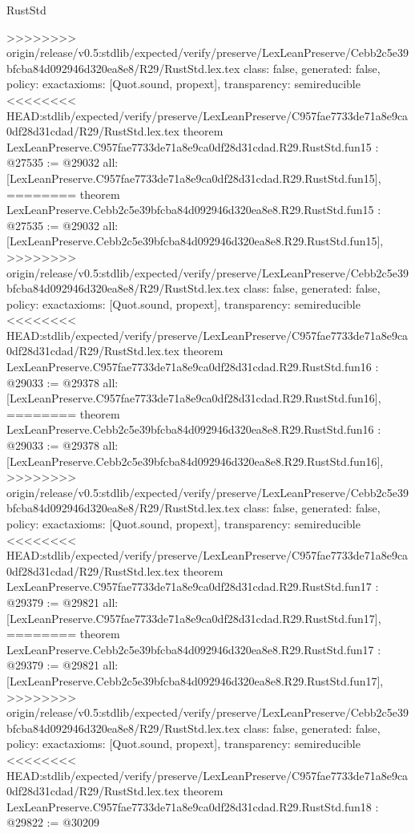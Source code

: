 \begin{lexlean}{RustStd}
\begin{coremodule}
{\begin{coremodule}
{{{{{{{{{{{{{{{{{{>>>>>>>> origin/release/v0.5:stdlib/expected/verify/preserve/LexLeanPreserve/Cebb2c5e39bfcba84d092946d320ea8e8/R29/RustStd.lex.tex
  class: false,
  generated: false,
  policy: exact{axioms: [Quot.sound, propext]},
  transparency: semireducible
}
<<<<<<<< HEAD:stdlib/expected/verify/preserve/LexLeanPreserve/C957fae7733de71a8e9ca0df28d31cdad/R29/RustStd.lex.tex
theorem LexLeanPreserve.C957fae7733de71a8e9ca0df28d31cdad.R29.RustStd.fun15 : @27535 := @29032 {
  all: [LexLeanPreserve.C957fae7733de71a8e9ca0df28d31cdad.R29.RustStd.fun15],
========
theorem LexLeanPreserve.Cebb2c5e39bfcba84d092946d320ea8e8.R29.RustStd.fun15 : @27535 := @29032 {
  all: [LexLeanPreserve.Cebb2c5e39bfcba84d092946d320ea8e8.R29.RustStd.fun15],
>>>>>>>> origin/release/v0.5:stdlib/expected/verify/preserve/LexLeanPreserve/Cebb2c5e39bfcba84d092946d320ea8e8/R29/RustStd.lex.tex
  class: false,
  generated: false,
  policy: exact{axioms: [Quot.sound, propext]},
  transparency: semireducible
}
<<<<<<<< HEAD:stdlib/expected/verify/preserve/LexLeanPreserve/C957fae7733de71a8e9ca0df28d31cdad/R29/RustStd.lex.tex
theorem LexLeanPreserve.C957fae7733de71a8e9ca0df28d31cdad.R29.RustStd.fun16 : @29033 := @29378 {
  all: [LexLeanPreserve.C957fae7733de71a8e9ca0df28d31cdad.R29.RustStd.fun16],
========
theorem LexLeanPreserve.Cebb2c5e39bfcba84d092946d320ea8e8.R29.RustStd.fun16 : @29033 := @29378 {
  all: [LexLeanPreserve.Cebb2c5e39bfcba84d092946d320ea8e8.R29.RustStd.fun16],
>>>>>>>> origin/release/v0.5:stdlib/expected/verify/preserve/LexLeanPreserve/Cebb2c5e39bfcba84d092946d320ea8e8/R29/RustStd.lex.tex
  class: false,
  generated: false,
  policy: exact{axioms: [Quot.sound, propext]},
  transparency: semireducible
}
<<<<<<<< HEAD:stdlib/expected/verify/preserve/LexLeanPreserve/C957fae7733de71a8e9ca0df28d31cdad/R29/RustStd.lex.tex
theorem LexLeanPreserve.C957fae7733de71a8e9ca0df28d31cdad.R29.RustStd.fun17 : @29379 := @29821 {
  all: [LexLeanPreserve.C957fae7733de71a8e9ca0df28d31cdad.R29.RustStd.fun17],
========
theorem LexLeanPreserve.Cebb2c5e39bfcba84d092946d320ea8e8.R29.RustStd.fun17 : @29379 := @29821 {
  all: [LexLeanPreserve.Cebb2c5e39bfcba84d092946d320ea8e8.R29.RustStd.fun17],
>>>>>>>> origin/release/v0.5:stdlib/expected/verify/preserve/LexLeanPreserve/Cebb2c5e39bfcba84d092946d320ea8e8/R29/RustStd.lex.tex
  class: false,
  generated: false,
  policy: exact{axioms: [Quot.sound, propext]},
  transparency: semireducible
}
<<<<<<<< HEAD:stdlib/expected/verify/preserve/LexLeanPreserve/C957fae7733de71a8e9ca0df28d31cdad/R29/RustStd.lex.tex
theorem LexLeanPreserve.C957fae7733de71a8e9ca0df28d31cdad.R29.RustStd.fun18 : @29822 := @30209 {
}}}}}}}}}}}}}}}}}}}}}
\end{coremodule}}
\end{coremodule}
\end{lexlean}
